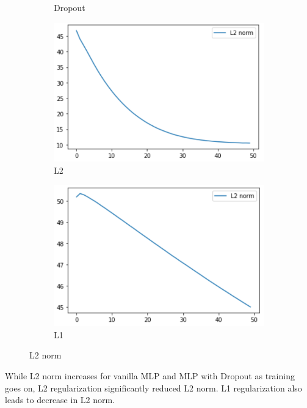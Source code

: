 \documentclass[11pt]{article}
\begin{document}
\begin{figure}[H]
\begin{subfigure}[H]{0.5\textwidth}
            \caption{Dropout}\vspace{2mm}
        \end{subfigure}
        \begin{subfigure}[H]{0.5\textwidth}
            \includegraphics[width=1\linewidth]{img/L2/l2.PNG}\caption{L2}
        \end{subfigure}
        \begin{subfigure}[H]{0.5\textwidth}
            \includegraphics[width=1\linewidth]{img/L1/l2.PNG}\caption{L1}
        \end{subfigure}
        \caption{L2 norm}
        \label{fig9}
    \end{figure}
    While L2 norm increases for vanilla MLP and MLP with Dropout as training goes on, L2 regularization significantly reduced L2 norm. L1 regularization also leads to decrease in L2 norm.
\end{document}
